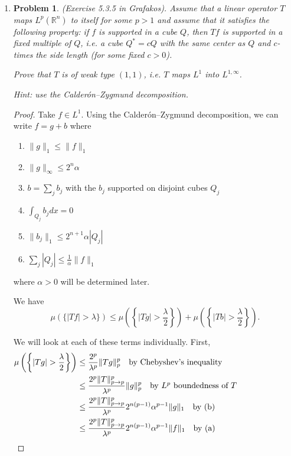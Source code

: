 \documentclass[a4paper]{article}
\newtheorem*{problem}{Problem}
\begin{document}
\begin{enumerate}
\begin{proof}
    Therefore, $m(\xi) = m(\frac{1}{a} \xi)$ for all $\xi$. Combining this with the fact that $m$ is odd, we know $m(\xi) = c \textup{ sgn} (\xi)$ for
    some $c>0$, and $T$ is a multiple of the Hilbert transform.

  \end{proof}

\item
  \begin{problem}
    (Exercise 5.3.5 in Grafakos). Assume that a linear operator  $ T$ maps $L^p (\mathbb R^n)$ to itself for some $p >1$ and assume that it satisfies the following property: if $f$ is supported in a cube $Q$, then $Tf$ is supported in a fixed multiple of $Q$, i.e. a cube $Q^* = c Q$ with the same center as $Q$ and $c$-times the side length (for some fixed $c>0$).

    Prove that $T$ is of weak type $(1,1)$, i.e. $T$ maps $L^1$ into $L^{1,\infty}$.

    Hint: use the Calder\'{o}n--Zygmund decomposition.
  \end{problem}

  \begin{proof}

    Take $f \in L^1$. Using the Calder\'{o}n--Zygmund decomposition, we can write $f = g+b$ where
    \begin{enumerate}
      \item $\|g\|_1 \leq \|f\|_1$
      \item $ \|g\|_\infty \leq 2^{n} \alpha$
      \item $b = \sum_j b_j$ with the $b_j$ supported on disjoint cubes $Q_j$
      \item $\int_{Q_j}^{}b_j dx = 0$
      \item $\| b_j \|_1 \leq 2^{n+1}\alpha |Q_j|$
      \item $ \sum_j |Q_j| \leq \frac{1}{\alpha} \| f \|_1$
    \end{enumerate}
    where $\alpha > 0$ will be determined later.

    We have
    \[ \mu \left( \{ |Tf| > \lambda \} \right) \leq \mu \left( \left\{ |Tg| > \frac{\lambda}{2} \right\} \right) + \mu \left( \left\{ |Tb| >
      \frac{\lambda}{2} \right\} \right) .\]

    We will look at each of these terms individually. First,
    \begin{align*}
      \mu\left( \left\{ |Tg| > \frac{\lambda}{2} \right\} \right) &\leq \frac{2^p}{\lambda^p} \|Tg\|_p^p \quad \parbox{5cm}{by Chebyshev's inequality}
      \\
      &\leq \frac{2^p \|T\|_{p \to p}^p}{\lambda^p} \|g\|_p^p \quad \parbox{5cm}{by $L^p$ boundedness of $T$} \\
      &\leq \frac{2^p \|T\|_{p \to p}^p}{\lambda^p} 2^{n(p-1)} \alpha^{p-1} \|g\|_1 \quad \parbox{5cm}{by (b)} \\
      &\leq \frac{2^p \|T\|_{p \to p}^p}{\lambda^p} 2^{n(p-1)} \alpha^{p-1} \|f\|_1 \quad \parbox{5cm}{by (a)}
    \end{align*}


\end{proof}
\end{enumerate}
\end{document}
